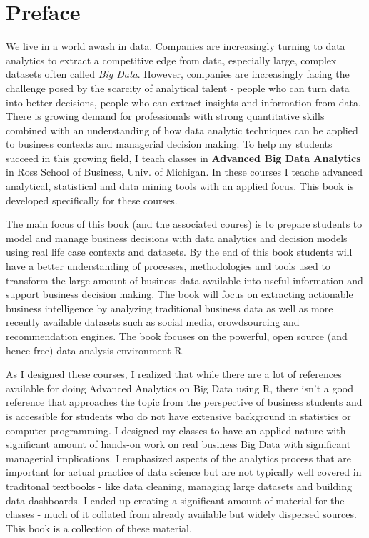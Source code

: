 \documentclass[]{krantz}
\begin{document}
\chapter*{Preface}\label{preface}


We live in a world awash in data. Companies are increasingly turning to
data analytics to extract a competitive edge from data, especially
large, complex datasets often called \emph{Big Data}. However, companies
are increasingly facing the challenge posed by the scarcity of
analytical talent - people who can turn data into better decisions,
people who can extract insights and information from data. There is
growing demand for professionals with strong quantitative skills
combined with an understanding of how data analytic techniques can be
applied to business contexts and managerial decision making. To help my
students succeed in this growing field, I teach classes in
\textbf{Advanced Big Data Analytics} in Ross School of Business, Univ.
of Michigan. In these courses I teache advanced analytical, statistical
and data mining tools with an applied focus. This book is developed
specifically for these courses.

The main focus of this book (and the associated coures) is to prepare
students to model and manage business decisions with data analytics and
decision models using real life case contexts and datasets. By the end
of this book students will have a better understanding of processes,
methodologies and tools used to transform the large amount of business
data available into useful information and support business decision
making. The book will focus on extracting actionable business
intelligence by analyzing traditional business data as well as more
recently available datasets such as social media, crowdsourcing and
recommendation engines. The book focuses on the powerful, open source
(and hence free) data analysis environment R.

As I designed these courses, I realized that while there are a lot of
references available for doing Advanced Analytics on Big Data using R,
there isn't a good reference that approaches the topic from the
perspective of business students and is accessible for students who do
not have extensive background in statistics or computer programming. I
designed my classes to have an applied nature with significant amount of
hands-on work on real business Big Data with significant managerial
implications. I emphasized aspects of the analytics process that are
important for actual practice of data science but are not typically well
covered in traditonal textbooks - like data cleaning, managing large
datasets and building data dashboards. I ended up creating a significant
amount of material for the classes - much of it collated from already
available but widely dispersed sources. This book is a collection of
these material.
\end{document}
